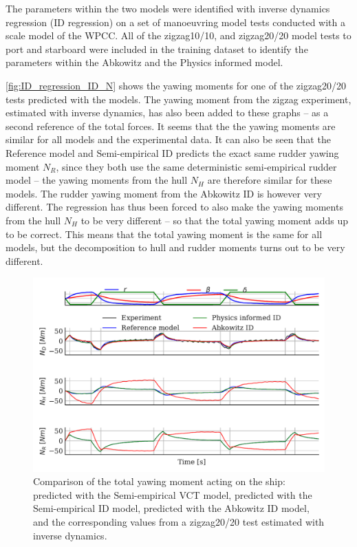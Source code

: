 The parameters within the two models were identified with inverse dynamics regression (ID regression) on a set of manoeuvring model tests conducted with a scale model of the WPCC. All of the zigzag10/10, and zigzag20/20 model tests to port and starboard were included in the training dataset to identify the parameters within the Abkowitz and the Physics informed model.

\autoref{fig:ID_regression_ID_N} shows the yawing moments for one of the zigzag20/20 tests predicted with the models. The yawing moment from the zigzag experiment, estimated with inverse dynamics, has also been added to these graphs -- as a second reference of the total forces. It seems that the the yawing moments are similar for all models and the experimental data. It can also be seen that the Reference model and Semi-empirical ID predicts the exact same rudder yawing moment $N_R$, since they both use the same deterministic semi-empirical rudder model -- the yawing moments from the hull $N_H$ are therefore similar for these models. The rudder yawing moment from the Abkowitz ID is however very different. The regression has thus been forced to also make the yawing moments from the hull $N_H$ to be very different -- so that the total yawing moment adds up to be correct. This means that the total yawing moment is the same for all models, but the decomposition to hull and rudder moments turns out to be very different.
\begin{figure}[h]
    \includegraphics[width=\columnwidth]{figures/result_ID_regression.ID_regression_ID_N.pdf}
    \caption{Comparison of the total yawing moment acting on the ship: predicted with the Semi-empirical VCT model, predicted with the Semi-empirical ID model, predicted with the Abkowitz ID model, and the corresponding values from a zigzag20/20 test estimated with inverse dynamics.}
    \label{fig:ID_regression_ID_N}
\end{figure}

